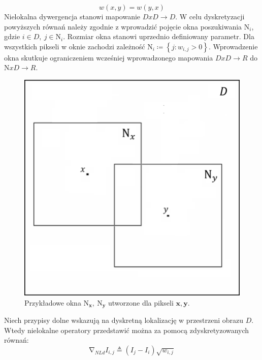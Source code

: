 \documentclass[12pt, twoside, openany]{report}
\theoremstyle{definition}
\begin{document}
\begin{equation}
w(x,y) = w(y,x)
\label{SMARTWEIGHT}
\end{equation}
Nielokalna dywergencja stanowi mapowanie $DxD\longrightarrow D$.
W celu dyskretyzacji powyższych równań należy zgodnie z \cite{gilboa2008nonlocal} wprowadzić pojęcie okna poszukiwania ${\mathrm{N}}_i$, gdzie $i\in D,\ j\in {\mathrm{N}}_i$. Rozmiar okna stanowi uprzednio definiowany parametr. Dla wszystkich pikseli w oknie zachodzi zależność ${\mathrm{N}}_i\coloneqq \left\{j:w_{i,j}>0\right\}$. Wprowadzenie okna skutkuje ograniczeniem wcześniej wprowadzonego mapowania $DxD\longrightarrow R$ do $\mathrm{N}xD\longrightarrow R$.
\begin{figure}[!h]
	\centering
	\includegraphics[scale=0.5]{rysunki/3_fig4.png}
	\caption{Przykładowe okna ${\boldsymbol{\mathrm{N}}}_{\boldsymbol{x}}\boldsymbol{,\ }{\boldsymbol{\mathrm{N}}}_{\boldsymbol{y}}$ utworzone dla pikseli $\boldsymbol{x},\boldsymbol{y}$.}
	\label{3_fig4}
\end{figure}
\par
Niech przypisy dolne wskazują na dyskretną lokalizację w przestrzeni obrazu $D$. Wtedy nielokalne operatory przedstawić można za pomocą zdyskretyzowanych równań:
\begin{equation}
{\mathrm{\nabla }}_{NLd}I_{i,j}\triangleq \left(I_j-I_i\right)\sqrt{w_{i,j}}
\label{DNLGRAD}
\end{equation}
\end{document}
